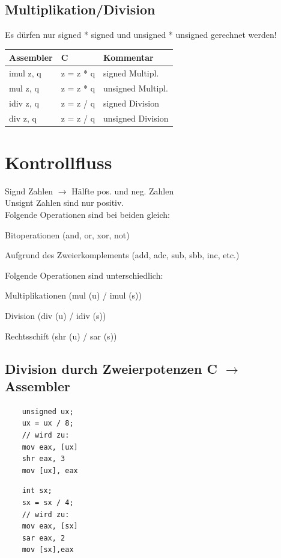 \documentclass[8pt,landscape,a4paper]{scrartcl}
\begin{document}
\begin{multicols*}{5}
\subsection{Multiplikation/Division}
Es dürfen nur signed * signed und unsigned * unsigned gerechnet werden!
\vspace{-4pt}
\begin{center}
	\begin{tabular}{p{1cm} | p{1.2cm} | p{2.2cm}}
		Assembler&C&Kommentar\\
		\hline
		imul z, q&z = z * q&signed Multipl.\\
		mul z, q&z = z * q&unsigned Multipl.\\
		idiv z, q&z = z / q&signed Division\\
		div z, q&z = z / q&unsigned Division\\
	\end{tabular}
\end{center}






\section{Kontrollfluss}
\textcolor{b}{Signd} Zahlen $\rightarrow$ Hälfte pos. und neg. Zahlen\\
\textcolor{b}{Unsignt} Zahlen sind nur positiv.\\
Folgende Operationen sind bei beiden gleich:
\begin{compactitem}
	\item Bitoperationen (and, or, xor, not)
	\item Aufgrund des Zweierkomplements (add, adc, sub, sbb, inc, etc.)
\end{compactitem}
Folgende Operationen sind unterschiedlich:
\begin{compactitem}
	\item Multiplikationen (mul (u) / imul (s))
	\item Division (div (u) / idiv (s))
	\item Rechtsschift (shr (u) / sar (s))
\end{compactitem}
\subsection{Division durch Zweierpotenzen C $\rightarrow$ Assembler}
\begin{multicols}{2}
	\begin{lstlisting}
	unsigned ux;
	ux = ux / 8;
	// wird zu:
	mov eax, [ux]
	shr eax, 3
	mov [ux], eax
	\end{lstlisting}
	\begin{lstlisting}
	int sx;
	sx = sx / 4;
	// wird zu:
	mov eax, [sx]
	sar eax, 2
	mov [sx],eax
	\end{lstlisting}
\end{multicols}

\end{multicols*}
\end{document}
